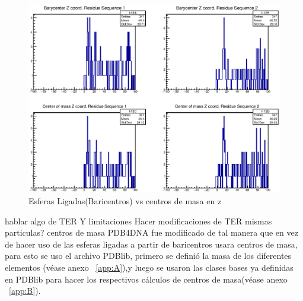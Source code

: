 \begin{figure}[htbp]
    \centering
    \includegraphics[width=1\linewidth]{./Figures/can3.eps}
  \caption[Esferas Ligadas(Baricentros) vs centros de masa en z]{Esferas Ligadas(Baricentros) vs centros de masa en z}
    \label{fig:canz}
\end{figure}


hablar algo de TER Y limitaciones
Hacer modificaciones de TER
mismas particulas?
centros de masa
PDB4DNA fue modificado de tal manera que en vez de hacer uso de las esferas ligadas a partir de baricentros usara centros de masa, para esto se uso el archivo PDBlib, primero se definió la masa de los diferentes elementos (véase anexo ~\ref{app:A}),y luego se usaron las clases bases ya definidas en PDBlib para hacer los respectivos cálculos de centros de masa(véase anexo ~\ref{app:B}).\\
